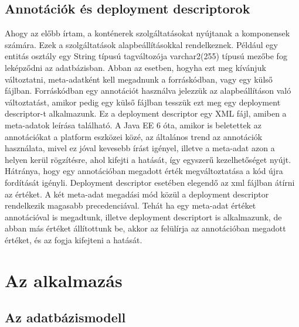 \documentclass[centeredchapter]{thesis-ekf}
\theoremstyle{definition}
\theoremstyle{remark}
\begin{document}
\section{Annotációk és deployment descriptorok}

Ahogy az előbb írtam, a konténerek szolgáltatásokat nyújtanak a komponensek számára. Ezek a szolgáltatások alapbeállításokkal rendelkeznek. Például egy entitás osztály egy String típusú tagváltozója varchar2(255) típusú mezőbe fog leképződni az adatbázisban. Abban az esetben, hogyha ezt meg kívánjuk változtatni, meta-adatként kell megadnunk a forráskódban, vagy egy külső fájlban. Forráskódban egy annotációt használva jelezzük az alapbeállításon való változtatást, amikor pedig egy külső fájlban tesszük ezt meg egy deployment descriptor-t alkalmazunk. Ez a deployment descriptor egy XML fájl, amiben a meta-adatok leírása található. A Java EE 6 óta, amikor is beletettek az annotációkat a platform eszközei közé, az általános trend az annotációk használata, mivel ez jóval kevesebb írást igényel, illetve a meta-adat azon a helyen kerül rögzítésre, ahol kifejti a hatását, így egyszerű kezelhetőséget nyújt. Hátránya, hogy egy annotációban megadott érték megváltoztatása a kód újra fordítását igényli. Deployment descriptor esetében elegendő az xml fájlban átírni az értéket.
A két meta-adat megadási mód közül a deployment descriptor rendelkezik magasabb precedenciával. Tehát ha egy meta-adat értéket annotációval is megadtunk, illetve deployment descriptort is alkalmazunk, de abban más értéket állítottunk be, akkor az felülírja az annotációban megadott értéket, és az fogja kifejteni a hatását.

\chapter{Az alkalmazás}

\section{Az adatbázismodell}
\end{document}
